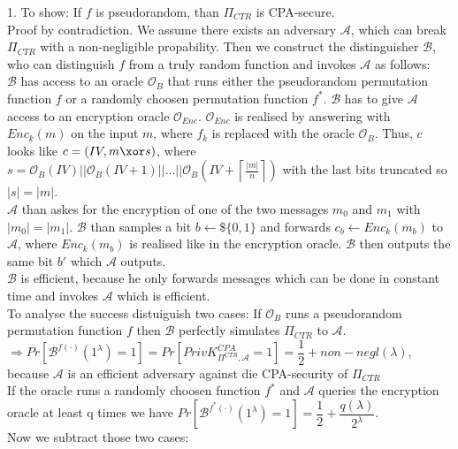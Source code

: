 1. To show: If \(f\) is pseudorandom, than \(\Pi_{CTR}\) is CPA-secure. \\
Proof by contradiction. We assume there exists an adversary \(\mathcal{A}\), which can break \(\Pi_{CTR}\) with a non-negligible propability. Then we construct the distinguisher \(\mathcal{B}\), who can distinguish \(f\) from a truly random function and invokes \(\mathcal{A}\) as follows: \\
\(\mathcal{B}\) has access to an oracle \(\mathcal{O}_{B}\) that runs either the pseudorandom permutation function \(f\) or a randomly choosen permutation function \(f^*\).
\(\mathcal{B}\) has to give \(\mathcal{A}\) access to an encryption oracle \(\mathcal{O}_{Enc}\). \(\mathcal{O}_{Enc}\) is realised by answering with \(Enc_k(m)\) on the input \(m\), where \(f_k\) is replaced with the oracle \(\mathcal{O}_{B}\). Thus, \(c\) looks like \(c = (IV, m \xor s)\), where \(s = \mathcal{O}_{B}(IV) \vert\vert \mathcal{O}_{B}(IV + 1) \vert\vert ... \vert\vert \mathcal{O}_{B}\left(IV + \left\lceil \frac{\vert m \vert}{n}\right \rceil \right) \) 
with the last bits truncated so \(\vert s \vert = \vert m \vert\).\\
\(\mathcal{A}\) than askes for the encryption of one of the two messages \(m_0\) and \(m_1\) with \(\vert m_0 \vert = \vert m_1 \vert \). \(\mathcal{B}\) than samples a bit \(b \leftarrow\$ \{0,1\}\) and forwards \(c_b \leftarrow Enc_k(m_b)\) to \(\mathcal{A}\), where \(Enc_k(m_b)\) is realised like in the encryption oracle. \(\mathcal{B}\) then outputs the same bit \(b'\) which \(\mathcal{A}\) outputs. \\
\(\mathcal{B}\) is efficient, because he only forwards messages which can be done in constant time and invokes \(\mathcal{A}\) which is efficient.\\
To analyse the success distuiguish two cases: If \(\mathcal{O}_{B}\) runs a pseudorandom permutation function \(f\) then \(\mathcal{B}\) perfectly simulates \(\Pi_{CTR}\) to \(\mathcal{A}\). \(\Rightarrow Pr[\mathcal{B}^{f(\cdot)}(1^\lambda) = 1] = Pr[PrivK^{CPA}_{\Pi^{CTR},\mathcal{A}} = 1] = \dfrac{1}{2} + non-negl(\lambda)\), because \(\mathcal{A}\) is an efficient adversary against die CPA-security of \(\Pi_{CTR}\)\\
If the oracle runs a randomly choosen function \(f^*\) and \(\mathcal{A}\) queries the encryption oracle at least q times we have \(Pr[\mathcal{B}^{f^*(\cdot)}(1^\lambda) = 1] = \dfrac{1}{2} + \dfrac{q(\lambda)}{2^\lambda}\).\\
Now we subtract those two cases:\\
